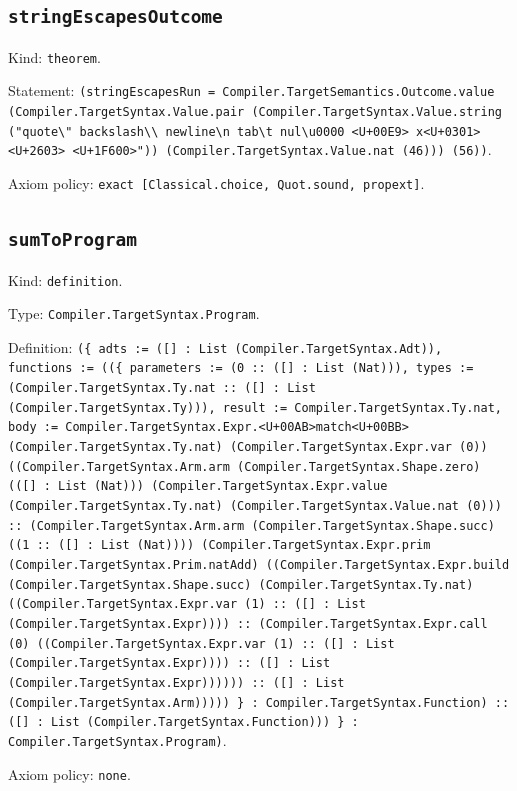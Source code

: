 \documentclass[11pt]{article}
\begin{document}
\subsection*{\texttt{stringEscapesOutcome}}
\noindent Kind: \texttt{theorem}.\par
\noindent Statement: \texttt{(stringEscapesRun = Compiler.TargetSemantics.Outcome.value (Compiler.TargetSyntax.Value.pair (Compiler.TargetSyntax.Value.string ("quote\textbackslash{}" backslash\textbackslash{}\textbackslash{} newline\textbackslash{}n tab\textbackslash{}t nul\textbackslash{}u0000 <U+00E9> x<U+0301> <U+2603> <U+1F600>")) (Compiler.TargetSyntax.Value.nat (46))) (56))}.\par
\noindent Axiom policy: \texttt{exact [Classical.choice, Quot.sound, propext]}.\par
\subsection*{\texttt{sumToProgram}}
\noindent Kind: \texttt{definition}.\par
\noindent Type: \texttt{Compiler.TargetSyntax.Program}.\par
\noindent Definition: \texttt{(\{ adts := ([] : List (Compiler.TargetSyntax.Adt)), functions := ((\{ parameters := (0 :: ([] : List (Nat))), types := (Compiler.TargetSyntax.Ty.nat :: ([] : List (Compiler.TargetSyntax.Ty))), result := Compiler.TargetSyntax.Ty.nat, body := Compiler.TargetSyntax.Expr.<U+00AB>match<U+00BB> (Compiler.TargetSyntax.Ty.nat) (Compiler.TargetSyntax.Expr.var (0)) ((Compiler.TargetSyntax.Arm.arm (Compiler.TargetSyntax.Shape.zero) (([] : List (Nat))) (Compiler.TargetSyntax.Expr.value (Compiler.TargetSyntax.Ty.nat) (Compiler.TargetSyntax.Value.nat (0))) :: (Compiler.TargetSyntax.Arm.arm (Compiler.TargetSyntax.Shape.succ) ((1 :: ([] : List (Nat)))) (Compiler.TargetSyntax.Expr.prim (Compiler.TargetSyntax.Prim.natAdd) ((Compiler.TargetSyntax.Expr.build (Compiler.TargetSyntax.Shape.succ) (Compiler.TargetSyntax.Ty.nat) ((Compiler.TargetSyntax.Expr.var (1) :: ([] : List (Compiler.TargetSyntax.Expr)))) :: (Compiler.TargetSyntax.Expr.call (0) ((Compiler.TargetSyntax.Expr.var (1) :: ([] : List (Compiler.TargetSyntax.Expr)))) :: ([] : List (Compiler.TargetSyntax.Expr)))))) :: ([] : List (Compiler.TargetSyntax.Arm))))) \} : Compiler.TargetSyntax.Function) :: ([] : List (Compiler.TargetSyntax.Function))) \} : Compiler.TargetSyntax.Program)}.\par
\noindent Axiom policy: \texttt{none}.\par
\end{document}
